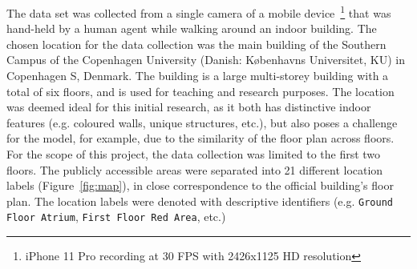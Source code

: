 \documentclass{article}
\begin{document}
  The data set was collected from a single camera of a mobile
  device~\footnote{iPhone 11 Pro recording at 30 FPS with 2426x1125 HD
  resolution} that was hand-held by a human agent while walking around an indoor
  building. The chosen location for the data collection was the main building of
  the Southern Campus of the Copenhagen University (Danish: K\o{}benhavns
  Universitet, KU) in Copenhagen S, Denmark. The building is a large
  multi-storey building with a total of six floors, and is used for teaching and
  research purposes. The location was deemed ideal for this initial research, as
  it both has distinctive indoor features (e.g. coloured walls, unique
  structures, etc.), but also poses a challenge for the model, for example, due
  to the similarity of the floor plan across floors.
  For the scope of this project, the data collection was limited to the first
  two floors. The publicly accessible areas were separated into 21 different
  location labels (Figure~\ref{fig:map}), in close correspondence to the
  official building's floor plan. The location labels were denoted with
  descriptive identifiers (e.g. \texttt{Ground Floor Atrium},
  \texttt{First Floor Red Area}, etc.)
\end{document}
